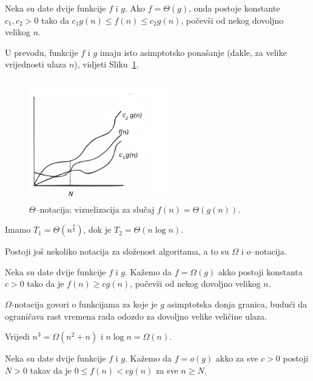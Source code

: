 \begin{definition}
Neka su date dvije funkcije $f$ i $g$.  Ako $f = \Theta(g)$, onda postoje konstante $c_1, c_2 >0$ tako da $c_1 g(n) \leq f(n) \leq c_2 g(n)$, počevši od nekog dovoljno velikog $n$. 
\end{definition}

U prevodu, funkcije $f$ i $g$ imaju isto asimptotsko ponašanje (dakle, za velike vrijednosti ulaza $n$), vidjeti Sliku~\ref{fig:theta_notation}. 

\begin{figure}[H]
	\centering
	\includegraphics[width=170pt,height=150pt]{slike/theta-notation.png}
 
	\caption{$\Theta$--notacija: vizuelizacija za slučaj $f(n)=\Theta(g(n))$.}	\label{fig:theta_notation}
\end{figure}

\begin{example}
Imamo	$T_1 = \Theta(n^{\frac{3}{2}})$, dok je $T_2 = \Theta(n \log n)$.  
\end{example}

Postoji još nekoliko notacija za složenost algoritama, a to su $\Omega$ i $o$--notacija.

\begin{definition}
 Neka su date dvije funkcije $f$ i $g$. Kažemo da $f = \Omega(g)$ akko postoji konstanta $c >0$ tako da je $f(n) \geq c g(n)$, počevši od nekog dovoljno velikog $n$.  
\end{definition}
$\Omega$-notacija govori o funkcijama za koje je $g$ asimptotska donja granica, budući da ograničava rast vremena rada odozdo za dovoljno velike veličine ulaza.

\begin{example}
  Vrijedi $n^3= \Omega(n^2 + n)$ i $n\log n = \Omega(n)$.
\end{example}

\begin{definition}
	Neka su date dvije funkcije $f$ i $g$. Kažemo da $f = o(g)$ akko za sve $c > 0$ postoji   $N > 0$ takav da je $0 \leq f(n) < cg(n)$ za sve $n \geq N$. 
	
\end{definition}

